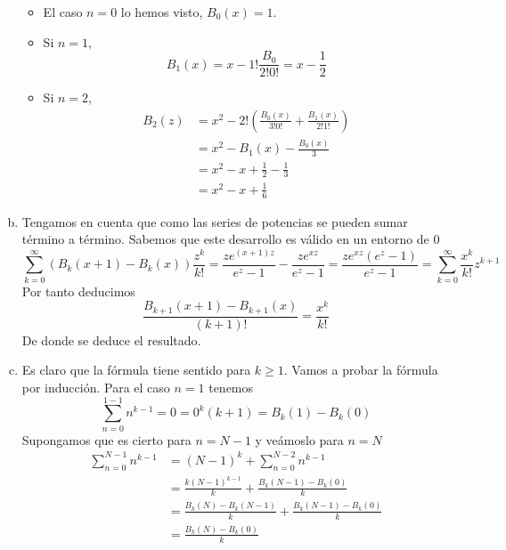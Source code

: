 \documentclass[twoside]{article}
\begin{document}
\begin{solucion}
\begin{enumerate}[(a)]
\begin{itemize}
\item El caso $n=0$ lo hemos visto, $B_0(x)=1$.
\item Si $n=1$,
$$
B_1(x)=x-1!\frac{B_0}{2!0!}=x-\frac{1}{2}
$$
\item Si $n=2$,
\begin{align*}
B_2(z)&=x^2 - 2!\left(\frac{B_0(x)}{3!0!}+\frac{B_1(x)}{2!1!}\right)\\
&= x^2 -B_1(x) - \frac{B_0(x)}{3}\\
&=x^2 -x+\frac{1}{2}-\frac{1}{3}\\
&= x^2-x + \frac{1}{6}
\end{align*}
\end{itemize}
%
\item Tengamos en cuenta que como las series de potencias se pueden sumar término a término. Sabemos que este desarrollo es válido en un entorno de $0$
$$
\sum_{k=0}^\infty(B_k(x+1)-B_k(x))\frac{z^k}{k!}=\frac{ze^{(x+1)z}}{e^z-1}- \frac{ze^{xz}}{e^z-1} = \frac{ze^{xz}(e^z-1)}{e^z-1} = \sum_{k=0}^\infty \frac{x^{k}}{k!}z^{k+1}
$$
Por tanto deducimos
$$
\frac{B_{k+1}(x+1)-B_{k+1}(x)}{(k+1)!} = \frac{x^k}{k!}
$$
De donde se deduce el resultado.
\item Es claro que la fórmula tiene sentido para $k\geq 1$. Vamos a probar la fórmula por inducción. Para el caso $n=1$ tenemos
$$\sum_{n=0}^{1-1} n^{k-1} =0= 0^k(k+1)  = B_k(1)-B_k(0)
$$
Supongamos que es cierto para $n=N-1$ y veámoslo para $n=N$
\begin{align*}
\sum_{n=0}^{N-1} n^{k-1} &= (N-1)^k + \sum_{n=0}^{N-2} n^{k-1} \\
&=\frac{k(N-1)^{k-1}}{k}+ \frac{B_k(N-1)-B_k(0)}{k} \\
&=\frac{B_k(N)-B_k(N-1)}{k}  + \frac{B_k(N-1)-B_k(0)}{k}\\
&= \frac{B_k(N)-B_k(0)}{k}
\end{align*}
\end{enumerate}
\end{solucion}

\newpage 
\begin{ejercicio}{8}
\end{ejercicio}
\begin{solucion}
\end{solucion}
\end{document}
